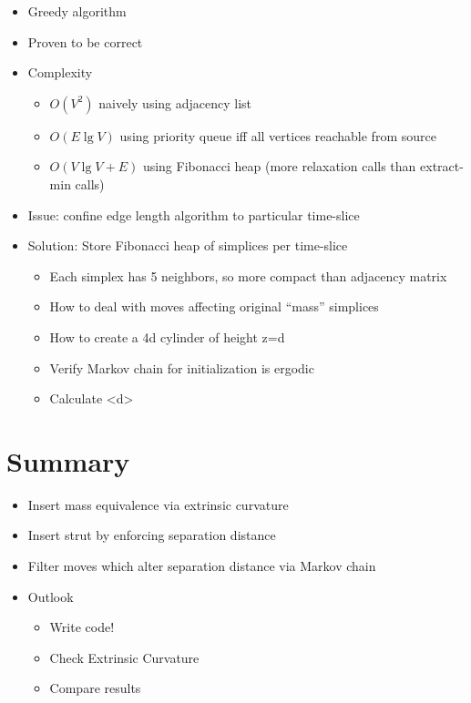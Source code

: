 \documentclass{article}
\begin{document}
\begin{itemize}
\item Greedy algorithm
\item Proven to be correct
\item Complexity

\begin{itemize}
\item $O(V^{2})$ naively using adjacency list
\item $O(E\lg V)$ using priority queue iff all vertices reachable from
source
\item $O(V\lg V+E)$ using Fibonacci heap (more relaxation calls than extract-min
calls)
\end{itemize}
\item Issue: confine edge length algorithm to particular time-slice
\item Solution: Store Fibonacci heap of simplices per time-slice

\begin{itemize}
\item Each simplex has 5 neighbors, so more compact than adjacency matrix
\end{itemize}

\begin{itemize}
\item How to deal with moves affecting original ``mass'' simplices
\item How to create a 4d cylinder of height z=d
\item Verify Markov chain for initialization is ergodic
\item Calculate <d>
\end{itemize}
\end{itemize}

\section{Summary}
\begin{itemize}
\item Insert mass equivalence via extrinsic curvature
\item Insert strut by enforcing separation distance
\item Filter moves which alter separation distance via Markov chain
\item Outlook

\begin{itemize}
\item Write code!
\item Check Extrinsic Curvature
\item Compare results
\end{itemize}
\end{itemize}



\end{document}
